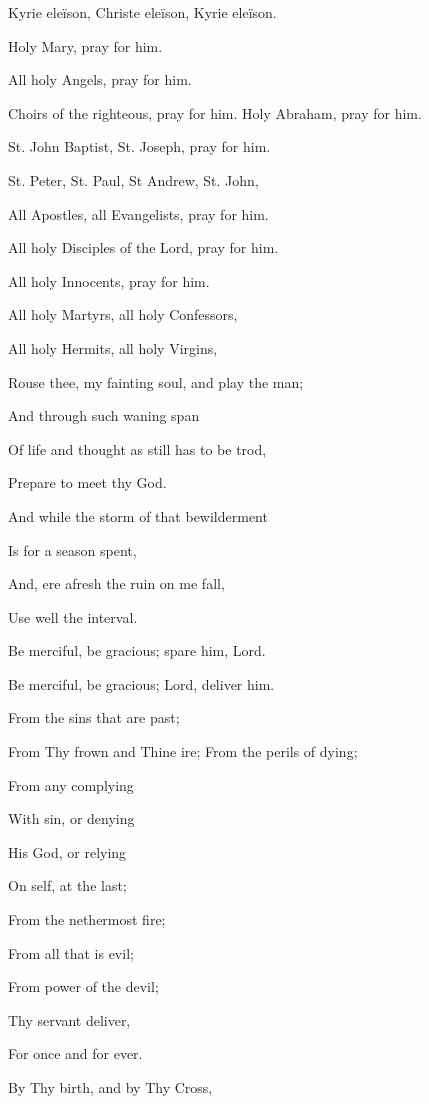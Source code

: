 Kyrie eleïson, Christe eleïson, Kyrie eleïson.

Holy Mary, pray for him.

All holy Angels, pray for him.

Choirs of the righteous, pray for him. Holy Abraham, pray for him.

St. John Baptist, St. Joseph, pray for him.

St. Peter, St. Paul, St Andrew, St. John,

All Apostles, all Evangelists, pray for him.

All holy Disciples of the Lord, pray for him.

All holy Innocents, pray for him.

All holy Martyrs, all holy Confessors,

All holy Hermits, all holy Virgins,


Rouse thee, my fainting soul, and play the man;

And through such waning span

Of life and thought as still has to be trod,

Prepare to meet thy God.

And while the storm of that bewilderment

Is for a season spent,

And, ere afresh the ruin on me fall,

Use well the interval.


Be merciful, be gracious; spare him, Lord.

Be merciful, be gracious; Lord, deliver him.

From the sins that are past;

From Thy frown and Thine ire; From the perils of dying;

From any complying

With sin, or denying

His God, or relying

On self, at the last;

From the nethermost fire;

From all that is evil;

From power of the devil;

Thy servant deliver,

For once and for ever.

By Thy birth, and by Thy Cross,

